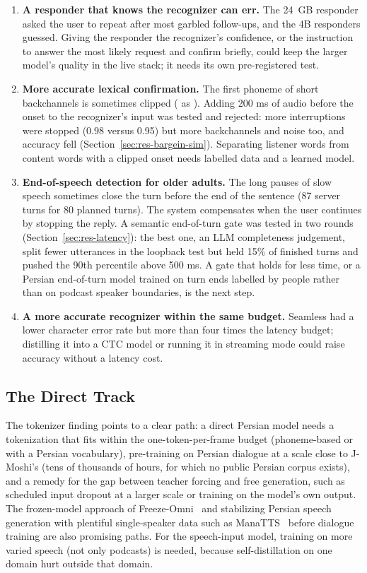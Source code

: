 \begin{enumerate}
\item \textbf{A responder that knows the recognizer can err.} The 24~GB responder asked the user
      to repeat after most garbled follow-ups, and the 4B responders guessed. Giving the responder
      the recognizer's confidence, or the instruction to answer the most likely request and confirm
      briefly, could keep the larger model's quality in the live stack; it needs its own
      pre-registered test.
\item \textbf{More accurate lexical confirmation.} The first phoneme of short backchannels is sometimes
      clipped ( as ). Adding 200 ms of audio before the onset to the recognizer's
      input was tested and rejected: more interruptions were stopped (0.98 versus 0.95) but more
      backchannels and noise too, and accuracy fell (Section~\ref{sec:res-bargein-sim}). Separating
      listener words from content words with a clipped onset needs labelled data and a learned model.
\item \textbf{End-of-speech detection for older adults.} The long pauses of slow speech sometimes close
      the turn before the end of the sentence (87 server turns for 80 planned turns). The system
      compensates when the user continues by stopping the reply. A semantic end-of-turn gate was tested
      in two rounds (Section~\ref{sec:res-latency}): the best one, an LLM completeness judgement,
      split fewer utterances in the loopback test but held 15\% of finished turns and pushed the 90th
      percentile above 500 ms. A gate that holds for less time, or a Persian end-of-turn model trained
      on turn ends labelled by people rather than on podcast speaker boundaries, is the next step.
\item \textbf{A more accurate recognizer within the same budget.} Seamless had a lower character error
      rate but more than four times the latency budget; distilling it into a CTC model or running it in
      streaming mode could raise accuracy without a latency cost.
\end{enumerate}

\subsection{The Direct Track}

The tokenizer finding points to a clear path: a direct Persian model needs a tokenization that fits
within the one-token-per-frame budget (phoneme-based or with a Persian vocabulary), pre-training on
Persian dialogue at a scale close to J-Moshi's (tens of thousands of hours, for which no public
Persian corpus exists), and a remedy for the gap between teacher forcing and free generation, such as
scheduled input dropout at a larger scale or training on the model's own output. The frozen-model
approach of Freeze-Omni~\cite{wang2025freezeomni} and stabilizing Persian speech generation with
plentiful single-speaker data such as ManaTTS~\cite{qharabagh2025manatts} before dialogue training are
also promising paths. For the speech-input model, training on more varied speech (not only podcasts)
is needed, because self-distillation on one domain hurt outside that domain.

